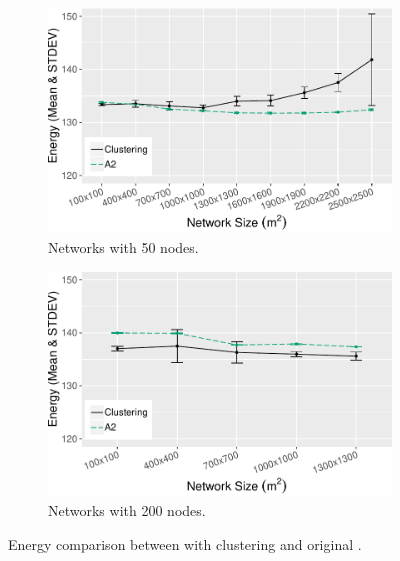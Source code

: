 \begin{figure}[bt]
    \centering
    \begin{subfigure}{0.45\textwidth}
        \centering
        \includegraphics[width=\textwidth]{figure/Results/ChaosComparison/ChaosComparison_50_Energy.pdf}
        \caption{Networks with 50 nodes.}
        \label{subfig:energy-50-nodes}
    \end{subfigure}
    \begin{subfigure}{0.45\textwidth}
        \centering
        \includegraphics[width=\textwidth]{figure/Results/ChaosComparison/ChaosComparison_200_Energy.pdf}
        \caption{Networks with 200 nodes.}
        \label{subfig:energy-200-nodes}
    \end{subfigure}
    \caption{Energy comparison between \atwo{} with clustering and original \atwo{}.}
    \label{fig:energy-results}
\end{figure}


